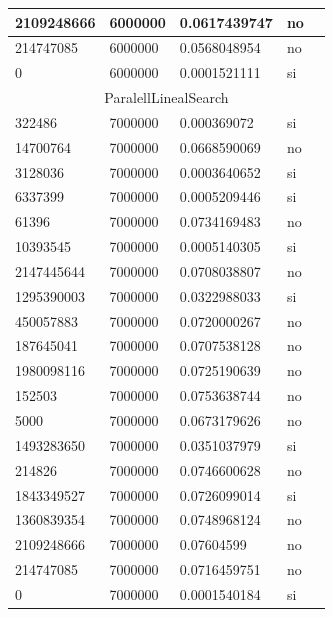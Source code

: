 \documentclass[12pt, fleqn]{article}                             %
\theoremstyle{break}                                            %
\begin{document}
\begin{longtable}{|m{5em}|m{5em}|m{10em}|m{5em}|@{}m{0pt}@{}}
            2109248666& 6000000  & 0.0617439747 & no &\\[1em]    \hline
            214747085& 6000000  & 0.0568048954 & no &\\[1em]    \hline
            0& 6000000  & 0.0001521111 & si &\\[1em]    \hline
            \multicolumn{5}{|c|}{ParalellLinealSearch}   \\          \hline
            322486& 7000000  & 0.000369072 & si &\\[1em]    \hline
            14700764& 7000000  & 0.0668590069 & no &\\[1em]    \hline
            3128036& 7000000  & 0.0003640652 & si &\\[1em]    \hline
            6337399& 7000000  & 0.0005209446 & si &\\[1em]    \hline
            61396& 7000000  & 0.0734169483 & no &\\[1em]    \hline
            10393545& 7000000  & 0.0005140305 & si &\\[1em]    \hline
            2147445644& 7000000  & 0.0708038807 & no &\\[1em]    \hline
            1295390003& 7000000  & 0.0322988033 & si &\\[1em]    \hline
            450057883& 7000000  & 0.0720000267 & no &\\[1em]    \hline
            187645041& 7000000  & 0.0707538128 & no &\\[1em]    \hline
            1980098116& 7000000  & 0.0725190639 & no &\\[1em]    \hline
            152503& 7000000  & 0.0753638744 & no &\\[1em]    \hline
            5000& 7000000  & 0.0673179626 & no &\\[1em]    \hline
            1493283650& 7000000  & 0.0351037979 & si &\\[1em]    \hline
            214826& 7000000  & 0.0746600628 & no &\\[1em]    \hline
            1843349527& 7000000  & 0.0726099014 & si &\\[1em]    \hline
            1360839354& 7000000  & 0.0748968124 & no &\\[1em]    \hline
            2109248666& 7000000  & 0.07604599 & no &\\[1em]    \hline
            214747085& 7000000  & 0.0716459751 & no &\\[1em]    \hline
            0& 7000000  & 0.0001540184 & si &\\[1em]    \hline

\end{longtable}
\end{document}
